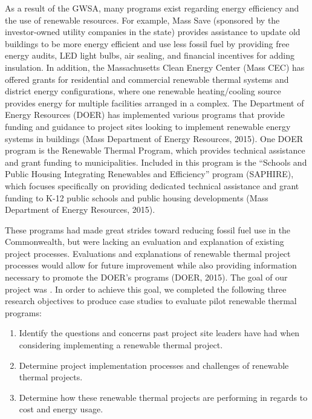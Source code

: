 \par As a result of the GWSA, many programs exist regarding energy efficiency and the use of renewable resources. For example, Mass Save (sponsored by the investor-owned utility companies in the state) provides assistance to update old buildings to be more energy efficient and use less fossil fuel by providing free energy audits, LED light bulbs, air sealing, and financial incentives for adding insulation. In addition, the Massachusetts Clean Energy Center (Mass CEC) has offered grants for residential and commercial renewable thermal systems and district energy configurations, where one renewable heating/cooling source provides energy for multiple facilities arranged in a complex. The Department of Energy Resources (DOER) has implemented various programs that provide funding and guidance to project sites looking to implement renewable energy systems in buildings (Mass Department of Energy Resources, 2015). One DOER program is the Renewable Thermal Program, which provides technical assistance and grant funding to municipalities. Included in this program is the “Schools and Public Housing Integrating Renewables and Efficiency” program (SAPHIRE), which focuses specifically on providing dedicated technical assistance and grant funding to K-12 public schools and public housing developments (Mass Department of Energy Resources, 2015).
\par These programs had made great strides toward reducing fossil fuel use in the Commonwealth, but were lacking an evaluation and explanation of existing project processes. Evaluations and explanations of renewable thermal project processes would allow for future improvement while also providing information necessary to promote the DOER’s programs (DOER, 2015). The goal of our project was \goal. In order to achieve this goal, we completed the following three research objectives to produce case studies to evaluate pilot renewable thermal programs:
\begin{enumerate}
  \item{Identify the questions and concerns past project site leaders have had when considering implementing a renewable thermal project.}
  \item{Determine project implementation processes and challenges of renewable thermal projects.}
  \item{Determine how these renewable thermal projects are performing in regards to cost and energy usage.}
\end{enumerate}


